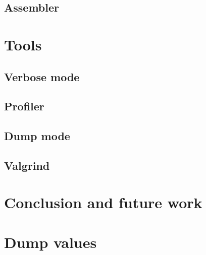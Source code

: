 \documentclass[12pt, oneside]{Thesis}
\begin{document}
    \section{Assembler}
    \label{Sec:TA}
    

  \chapter{Tools}
  \label{Chapt:Tools}

    \section{Verbose mode}
    \label{Sec:Verbose}
    

    \section{Profiler}
    \label{Sec:Profiler}
    

    \section{Dump mode}
    \label{Sec:Dump-mode}
    

    \section{Valgrind}
    \label{Sec:Valgrind}
    

\chapter{Conclusion and future work}


\clearpage
{}
\appendix
\baselineskip=16pt

\chapter{Dump values}
\label{Apendix:dump-values}

\end{document}

